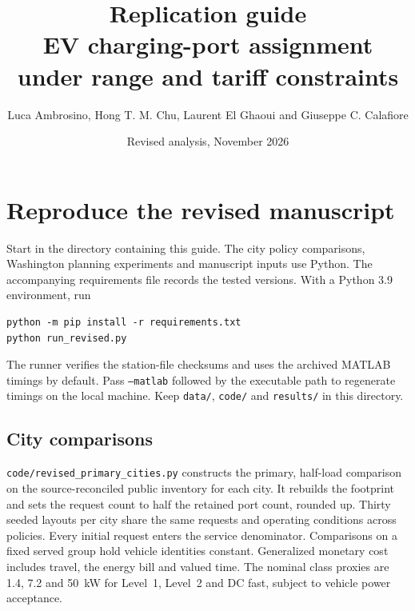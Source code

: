 \documentclass[11pt,a4paper]{article}
\title{Replication guide\\[4pt]\large EV charging-port assignment under range and tariff constraints}
\author{Luca Ambrosino, Hong T. M. Chu, Laurent El Ghaoui and Giuseppe C. Calafiore}
\date{Revised analysis, November 2026}
\begin{document}
\maketitle
\section*{Reproduce the revised manuscript}
Start in the directory containing this guide. The city policy comparisons, Washington planning experiments and manuscript inputs use Python. The accompanying requirements file records the tested versions. With a Python 3.9 environment, run
\begin{lstlisting}
python -m pip install -r requirements.txt
python run_revised.py
\end{lstlisting}
The runner verifies the station-file checksums and uses the archived MATLAB timings by default. Pass \texttt{--matlab} followed by the executable path to regenerate timings on the local machine. Keep \texttt{data/}, \texttt{code/} and \texttt{results/} in this directory.

\subsection*{City comparisons}
\texttt{code/revised\_primary\_cities.py} constructs the primary, half-load comparison on the source-reconciled public inventory for each city. It rebuilds the footprint and sets the request count to half the retained port count, rounded up. Thirty seeded layouts per city share the same requests and operating conditions across policies. Every initial request enters the service denominator. Comparisons on a fixed served group hold vehicle identities constant. Generalized monetary cost includes travel, the energy bill and valued time. The nominal class proxies are 1.4, 7.2 and 50~kW for Level~1, Level~2 and DC fast, subject to vehicle power acceptance.
\end{document}
